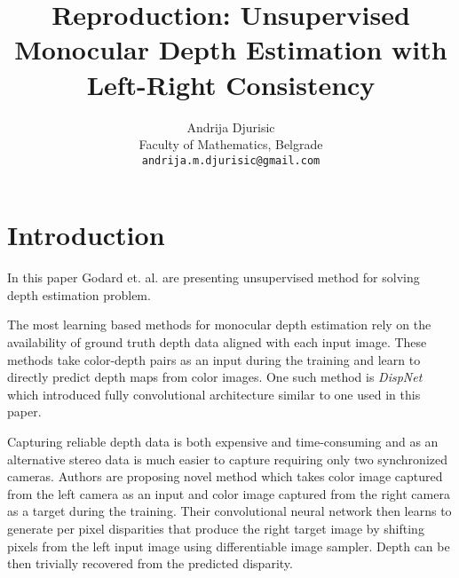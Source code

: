 \documentclass{article}
\title{Reproduction: Unsupervised Monocular Depth Estimation with Left-Right Consistency}
\author{
	Andrija Djurisic\\
	Faculty of Mathematics, Belgrade\\
	\texttt{andrija.m.djurisic@gmail.com} \\
}
\begin{document}
	
	\maketitle
	
	
\section{Introduction}
In this paper Godard et. al. \cite{DBLP:journals/corr/GodardAB16} are presenting unsupervised method for solving depth estimation problem. 


The most learning based methods for monocular depth estimation rely on the availability of ground truth depth data aligned with each input image. These methods take color-depth pairs as an input during the training and learn to directly predict depth maps from color images. One such method is \emph{DispNet} \cite{DBLP:journals/corr/MayerIHFCDB15} which introduced fully convolutional architecture similar to one used in this paper. 

Capturing reliable depth data is both expensive and time-consuming and as an alternative stereo data is much easier to capture requiring only two synchronized cameras. Authors are proposing novel method which takes color image captured from the left camera as an input and color image captured from the right camera as a target during the training. Their convolutional neural network then learns to generate per pixel disparities that produce the right target image by shifting pixels from the left input image using differentiable image sampler. Depth can be then trivially recovered from the predicted disparity.

\end{document}
